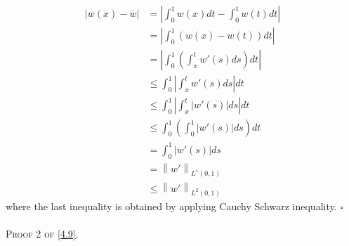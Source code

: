 \documentclass[a4paper]{article}
\numberwithin{equation}{section}
\begin{document}
\begin{align}
\left| {w\left( x \right) - \overline w } \right| &= \left| {\int_0^1 {w\left( x \right)dt}  - \int_0^1 {w\left( t \right)dt} } \right|\\
& = \left| {\int_0^1 {\left( {w\left( x \right) - w\left( t \right)} \right)dt} } \right|\\
& = \left| {\int_0^1 {\left( {\int_x^t {w'\left( s \right)ds} } \right)dt} } \right|\\
& \le \int_0^1 {\left| {\int_x^t {w'\left( s \right)ds} } \right|dt} \\
& \le \int_0^1 {\left| {\int_x^t {\left| {w'\left( s \right)} \right|ds} } \right|dt} \\
& \le \int_0^1 {\left( {\int_0^1 {\left| {w'\left( s \right)} \right|ds} } \right)dt} \\
& = \int_0^1 {\left| {w'\left( s \right)} \right|ds} \\
& = {\left\| {w'} \right\|_{{L^1}\left( {0,1} \right)}}\\
& \le {\left\| {w'} \right\|_{{L^2}\left( {0,1} \right)}}
\end{align}
where the last inequality is obtained by applying Cauchy Schwarz inequality. \hfill $\square$\\
\\
\textsc{Proof 2 of \eqref{4.9}.} 
\end{document}

